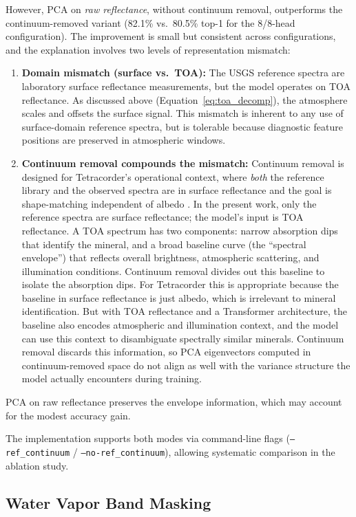 \documentclass[11pt]{report}
\begin{document}
However, PCA on \emph{raw reflectance}, without continuum removal, outperforms the continuum-removed variant (82.1\% vs.\ 80.5\% top-1 for the 8/8-head configuration).
The improvement is small but consistent across configurations, and the explanation involves two levels of representation mismatch:
\begin{enumerate}
  \item \textbf{Domain mismatch (surface vs.\ TOA):} The USGS reference spectra are laboratory surface reflectance measurements, but the model operates on TOA reflectance. As discussed above (Equation~\ref{eq:toa_decomp}), the atmosphere scales and offsets the surface signal. This mismatch is inherent to any use of surface-domain reference spectra, but is tolerable because diagnostic feature positions are preserved in atmospheric windows.
  \item \textbf{Continuum removal compounds the mismatch:} Continuum removal is designed for Tetracorder's operational context, where \emph{both} the reference library and the observed spectra are in surface reflectance and the goal is shape-matching independent of albedo \cite{clark2024tetracorder}.
  In the present work, only the reference spectra are surface reflectance; the model's input is TOA reflectance.
  A TOA spectrum has two components: narrow absorption dips that identify the mineral, and a broad baseline curve (the ``spectral envelope'') that reflects overall brightness, atmospheric scattering, and illumination conditions.
  Continuum removal divides out this baseline to isolate the absorption dips.
  For Tetracorder this is appropriate because the baseline in surface reflectance is just albedo, which is irrelevant to mineral identification.
  But with TOA reflectance and a Transformer architecture, the baseline also encodes atmospheric and illumination context, and the model can use this context to disambiguate spectrally similar minerals.
  Continuum removal discards this information, so PCA eigenvectors computed in continuum-removed space do not align as well with the variance structure the model actually encounters during training.
\end{enumerate}
PCA on raw reflectance preserves the envelope information, which may account for the modest accuracy gain.

The implementation supports both modes via command-line flags (\texttt{--ref\_continuum} / \texttt{--no-ref\_continuum}), allowing systematic comparison in the ablation study.

\subsection{Water Vapor Band Masking}
\label{sec:wv_mask}
\end{document}
